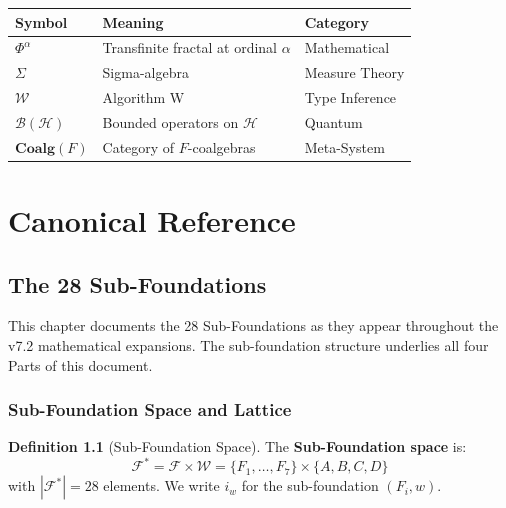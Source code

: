 \documentclass[11pt,twoside,openright]{book}
\theoremstyle{definition}
\newtheorem{definition}{Definition}[chapter]
\theoremstyle{plain}
\theoremstyle{remark}
\newcommand{\Worlds}{\mathcal{W}}
\newcommand{\Foundations}{\mathcal{F}}
\newcommand{\Hspace}{\mathcal{H}}
\newcommand{\TransFrac}[1]{\Phi^{#1}}        %
\newcommand{\SigAlg}{\Sigma}                 %
\newcommand{\AlgW}{\mathcal{W}}              %
\newcommand{\BoundedOp}{\mathcal{B}}         %
\newcommand{\Coalg}{\mathbf{Coalg}}          %
\begin{document}
\begin{center}
\begin{tabular}{lll}
\toprule
\textbf{Symbol} & \textbf{Meaning} & \textbf{Category} \\
\midrule
$\TransFrac{\alpha}$ & Transfinite fractal at ordinal $\alpha$ & Mathematical \\
$\SigAlg$ & Sigma-algebra & Measure Theory \\
$\AlgW$ & Algorithm W & Type Inference \\
$\BoundedOp(\Hspace)$ & Bounded operators on $\Hspace$ & Quantum \\
$\Coalg(F)$ & Category of $F$-coalgebras & Meta-System \\
\bottomrule
\end{tabular}
\end{center}

\tableofcontents

\mainmatter

\part{Canonical Reference}

\chapter{The 28 Sub-Foundations}
\label{ch:v72-28-subfoundations}

\begin{tcolorbox}[colback=gray!10!white,colframe=gray!75!black,title=\textbf{Canonical Reference (Inherited)}]
This chapter documents the 28 Sub-Foundations as they appear throughout the v7.2 mathematical expansions. The sub-foundation structure underlies all four Parts of this document.
\end{tcolorbox}

\section{Sub-Foundation Space and Lattice}

\begin{definition}[Sub-Foundation Space]
\label{def:v72-subfoundation-space}
The \textbf{Sub-Foundation space} is:
\[
\Foundations^* = \Foundations \times \Worlds = \{F_1, \ldots, F_7\} \times \{A, B, C, D\}
\]
with $|\Foundations^*| = 28$ elements. We write $i_w$ for the sub-foundation $(F_i, w)$.
\end{definition}
\end{document}
